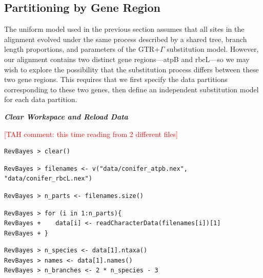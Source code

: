 \documentclass[11pt]{article}
\newcommand{\taha}[1]{{\textcolor{red}{[TAH comment: #1]}}} %
\begin{document}



\bigskip
\subsection{Partitioning by Gene Region}\label{secByGene}

The uniform model used in the previous section assumes that all sites in the alignment evolved under the same process described by a shared tree, branch length proportions, and parameters of the GTR+$\Gamma$ substitution model.
However, our alignment contains two distinct gene regions---atpB and rbcL---so we may wish to explore the possibility that the substitution process differs between these two gene regions.
This requires that we first specify the data partitions corresponding to these two genes, then define an independent substitution model for each data partition. 

\textbf{\textit{Clear Workspace and Reload Data}}

\taha{this time reading from 2 different files}

{\tt \begin{snugshade*}
\begin{lstlisting}
RevBayes > clear()
\end{lstlisting}
\end{snugshade*}}

{\tt \begin{snugshade*}
\begin{lstlisting}
RevBayes > filenames <- v("data/conifer_atpb.nex", "data/conifer_rbcL.nex")
\end{lstlisting}
\end{snugshade*}}

{\tt \begin{snugshade*}
\begin{lstlisting}
RevBayes > n_parts <- filenames.size()
\end{lstlisting}
\end{snugshade*}}

{\tt \begin{snugshade*}
\begin{lstlisting}
RevBayes > for (i in 1:n_parts){
RevBayes +    data[i] <- readCharacterData(filenames[i])[1]
RevBayes + }
\end{lstlisting}
\end{snugshade*}}

{\tt \begin{snugshade*}
\begin{lstlisting}
RevBayes > n_species <- data[1].ntaxa()
RevBayes > names <- data[1].names()
RevBayes > n_branches <- 2 * n_species - 3
\end{lstlisting}
\end{snugshade*}}
\end{document}
